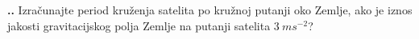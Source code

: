 

\noindent 
\textbf{
\thecjelina.\thezadatak.}
Izračunajte period kruženja satelita po kružnoj putanji oko Zemlje, ako je iznos jakosti gravitacijskog polja Zemlje na putanji satelita
$3\ ms^{-2}$?


